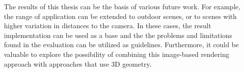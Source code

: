The results of this thesis can be the basis of various future work. For example, the range of application can be extended to outdoor scenes, or to scenes with higher variation in distances to the camera. In these cases, the result implementation can be used as a base and the the problems and limitations found in the evaluation can be utilized as guidelines. Furthermore, it could be valuable to explore the possibility of combining this image-based rendering approach with approaches that use 3D geometry.

